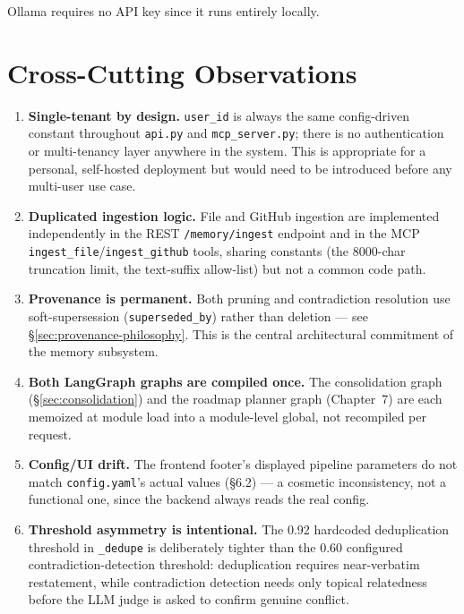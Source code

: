 \documentclass[11pt,a4paper]{report}
\newcommand{\code}[1]{\texttt{\small #1}}
\newcommand{\file}[1]{\texttt{\small\color{accent!70!black}#1}}
\begin{document}
Ollama requires no API key since it runs entirely locally.

\chapter{Cross-Cutting Observations}

\begin{enumerate}
\item \textbf{Single-tenant by design.} \code{user\_id} is always the same config-driven constant throughout \file{api.py} and \file{mcp\_server.py}; there is no authentication or multi-tenancy layer anywhere in the system. This is appropriate for a personal, self-hosted deployment but would need to be introduced before any multi-user use case.
\item \textbf{Duplicated ingestion logic.} File and GitHub ingestion are implemented independently in the REST \code{/memory/ingest} endpoint and in the MCP \code{ingest\_file}/\code{ingest\_github} tools, sharing constants (the 8000-char truncation limit, the text-suffix allow-list) but not a common code path.
\item \textbf{Provenance is permanent.} Both pruning and contradiction resolution use soft-supersession (\code{superseded\_by}) rather than deletion — see \S\ref{sec:provenance-philosophy}. This is the central architectural commitment of the memory subsystem.
\item \textbf{Both LangGraph graphs are compiled once.} The consolidation graph (\S\ref{sec:consolidation}) and the roadmap planner graph (Chapter~7) are each memoized at module load into a module-level global, not recompiled per request.
\item \textbf{Config/UI drift.} The frontend footer's displayed pipeline parameters do not match \file{config.yaml}'s actual values (\S6.2) — a cosmetic inconsistency, not a functional one, since the backend always reads the real config.
\item \textbf{Threshold asymmetry is intentional.} The 0.92 hardcoded deduplication threshold in \code{\_dedupe} is deliberately tighter than the 0.60 configured contradiction-detection threshold: deduplication requires near-verbatim restatement, while contradiction detection needs only topical relatedness before the LLM judge is asked to confirm genuine conflict.
\end{enumerate}
\end{document}
